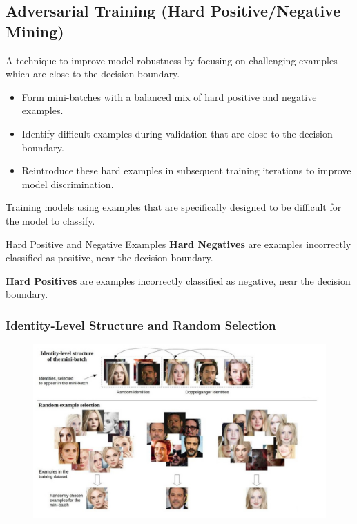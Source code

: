 \subsection{Adversarial Training (Hard Positive/Negative Mining)}
A technique to improve model robustness by focusing on challenging examples which are close to the decision boundary.


\begin{itemize}
    \item Form mini-batches with a balanced mix of hard positive and negative examples.
    \item Identify difficult examples during validation that are close to the decision boundary.
    \item Reintroduce these hard examples in subsequent training iterations to improve model discrimination.
\end{itemize}


Training models using examples that are specifically designed to be difficult for the model to classify.

\begin{definitionbox}{Hard Positive and Negative Examples}
\textbf{Hard Negatives} are examples incorrectly classified as positive, near the decision boundary.

\textbf{Hard Positives} are examples incorrectly classified as negative, near the decision boundary. 
    
\end{definitionbox}




\subsubsection*{Identity-Level Structure and Random Selection}
\begin{figure}[H]
    \centering
    \includegraphics[width=1\linewidth]{img/hardpos_negmin.png}
    
\end{figure}

